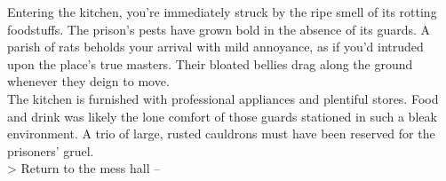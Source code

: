 Entering the kitchen, you're immediately struck by the ripe smell of its rotting foodstuffs. The prison's pests have grown bold in the absence of its guards. A parish of rats beholds your arrival with mild annoyance, as if you'd intruded upon the place's true masters. Their bloated bellies drag along the ground whenever they deign to move.\\

The kitchen is furnished with professional appliances and plentiful stores. Food and drink was likely the lone comfort of those guards stationed in such a bleak environment. A trio of large, rusted cauldrons must have been reserved for the prisoners' gruel.\\

> Return to the mess hall -- 